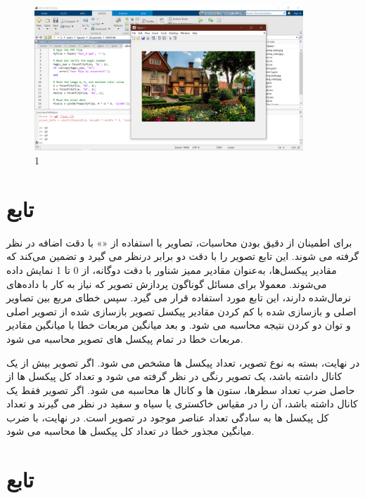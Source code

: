 \documentclass{article}
\begin{document}
\begin{figure}[H]
	\centering
	\includegraphics[width=0.9\textwidth]{3.png}
	\caption{1}
\end{figure}

	\section{تابع }
	
	\lr{}

برای اطمینان از دقیق بودن محاسبات، تصاویر با استفاده از «» با دقت  اضافه در نظر گرفته می شوند. این تابع تصویر را با دقت دو برابر درنظر می گیرد و تضمین می‌کند که مقادیر پیکسل‌ها، به‌عنوان مقادیر ممیز شناور با دقت دوگانه، از 0 تا 1 نمایش داده می‌شوند. معمولا برای مسائل گوناگون پردازش تصویر که نیاز به کار با داده‌های نرمال‌شده دارند، این تابع مورد استفاده قرار می گیرد. سپس خطای مربع بین تصاویر اصلی و بازسازی شده با کم کردن مقادیر پیکسل تصویر بازسازی شده از تصویر اصلی و توان دو کردن نتیجه محاسبه می شود. و بعد میانگین مربعات خطا با میانگین مقادیر مربعات خطا در تمام پیکسل های تصویر محاسبه می شود. 

در نهایت، بسته به نوع تصویر، تعداد پیکسل ها مشخص می شود. اگر تصویر بیش از یک کانال داشته باشد، یک تصویر رنگی در نظر گرفته می شود و تعداد کل پیکسل ها از حاصل ضرب تعداد سطرها، ستون ها و کانال ها محاسبه می شود. اگر تصویر فقط یک کانال داشته باشد، آن را در مقیاس خاکستری یا سیاه و سفید در نظر می گیرند و تعداد کل پیکسل ها به سادگی تعداد عناصر موجود در تصویر است.
در نهایت،  با ضرب میانگین مجذور خطا در تعداد کل پیکسل ها محاسبه می شود. \cite{5}
	
	\section{تابع }
	
\end{document}
